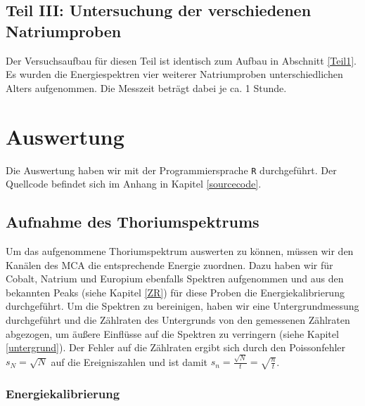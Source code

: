 \documentclass[12pt,listof=totoc]{scrartcl}
\newcommand{\code}[1]{\texttt{#1}}
\begin{document}
\subsection{Teil III: Untersuchung der verschiedenen Natriumproben}

Der Versuchsaufbau für diesen Teil ist identisch zum Aufbau in Abschnitt \ref{Teil1}.
Es wurden die Energiespektren vier weiterer Natriumproben unterschiedlichen Alters aufgenommen. Die Messzeit beträgt dabei je ca. 1 Stunde.


\newpage
\section{Auswertung}Die Auswertung haben wir mit der Programmiersprache \code{R} durchgeführt. Der Quellcode befindet sich im Anhang in Kapitel \ref{sourcecode}.
\subsection{Aufnahme des Thoriumspektrums}\label{thoriumspektrum}
Um das aufgenommene Thoriumspektrum auswerten zu können, müssen wir den Kanälen des MCA die entsprechende Energie zuordnen. Dazu haben wir für Cobalt, Natrium und Europium ebenfalls Spektren aufgenommen und aus den bekannten Peaks (siehe Kapitel \ref{ZR}) für diese Proben die Energiekalibrierung durchgeführt. Um die Spektren zu bereinigen, haben wir eine Untergrundmessung durchgeführt und die Zählraten des Untergrunds von den gemessenen Zählraten abgezogen, um äußere Einflüsse auf die Spektren zu verringern (siehe Kapitel \ref{untergrund}). Der Fehler auf die Zählraten ergibt sich durch den Poissonfehler $s_N=\sqrt{N}$ auf die Ereigniszahlen und ist damit $s_n=\frac{\sqrt{N}}{t}=\sqrt{\frac{n}{t}}$.\\

\newpage
\subsubsection{Energiekalibrierung}
\end{document}
